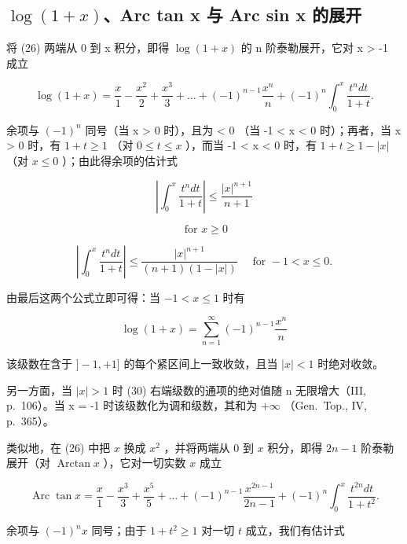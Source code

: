 \subsection{\texorpdfstring{\(\log(1 + x)\)、Arc tan x 与 Arc sin x 的展开}{log(1 + x)、Arc tan x 与 Arc sin x 的展开}}

将 (26) 两端从 0 到 x 积分，即得 \(\log(1 + x)\) 的 n 阶泰勒展开，它对 x \textgreater{} -1 成立

\[
\log (1 + x) = \frac {x}{1} - \frac {x ^ {2}}{2} + \frac {x ^ {3}}{3} + \dots + (- 1) ^ {n - 1} \frac {x ^ {n}}{n} + (- 1) ^ {n} \int_ {0} ^ {x} \frac {t ^ {n} d t}{1 + t}.\tag{27}
\]

余项与 \((-1)^{n}\) 同号（当 x \textgreater{} 0 时），且为 \textless{} 0 （当 -1 \textless{} x \textless{} 0 时）；再者，当 x \textgreater{} 0 时，有 \(1 + t \geqslant 1\) （对 \(0 \leqslant t \leqslant x\) ），而当 -1 \textless{} x \textless{} 0 时，有 \(1 + t \geqslant 1 - |x|\) （对 \(x \leqslant 0\) ）；由此得余项的估计式

\[
\left| \int_ {0} ^ {x} \frac {t ^ {n} d t}{1 + t} \right| \leqslant \frac {| x | ^ {n + 1}}{n + 1}
\]

\[
\text { for } x \geqslant 0\tag{28}
\]

\[
\left| \int_ {0} ^ {x} \frac {t ^ {n} d t}{1 + t} \right| \leqslant \frac {| x | ^ {n + 1}}{(n + 1) (1 - | x |)} \quad \text {   for   } - 1 <   x \leqslant 0.\tag{29}
\]

由最后这两个公式立即可得：当 \(-1 < x \leqslant 1\) 时有

\[
\log (1 + x) = \sum_ {n = 1} ^ {\infty} (- 1) ^ {n - 1} \frac {x ^ {n}}{n}\tag{30}
\]

该级数在含于 \(]-1,+1]\) 的每个紧区间上一致收敛，且当 \(|x|<1\) 时绝对收敛。

另一方面，当 \(|x| > 1\) 时 (30) 右端级数的通项的绝对值随 n 无限增大（III, p.~106）。当 x = -1 时该级数化为调和级数，其和为 \(+\infty\) （Gen.~Top., IV, p.~365）。

类似地，在 (26) 中把 \(x\) 换成 \(x^2\) ，并将两端从 0 到 \(x\) 积分，即得 \(2n - 1\) 阶泰勒展开（对 \(\operatorname{Arctan} x\) ），它对一切实数 \(x\) 成立

\[
\operatorname{Arc} \tan x = \frac {x}{1} - \frac {x ^ {3}}{3} + \frac {x ^ {5}}{5} + \dots + (- 1) ^ {n - 1} \frac {x ^ {2 n - 1}}{2 n - 1} + (- 1) ^ {n} \int_ {0} ^ {x} \frac {t ^ {2 n} d t}{1 + t ^ {2}}.\tag{31}
\]

余项与 \((-1)^n x\) 同号；由于 \(1 + t^2 \geqslant 1\) 对一切 \(t\) 成立，我们有估计式


